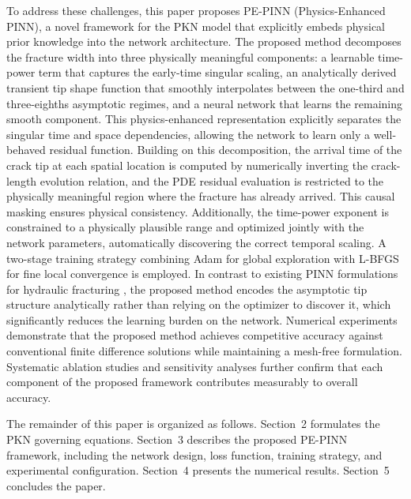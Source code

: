 \documentclass[a4paper,fleqn]{cas-sc}
\begin{document}
To address these challenges, this paper proposes PE-PINN
(Physics-Enhanced PINN), a novel framework for the PKN model that
explicitly embeds physical prior knowledge into the network architecture.
The proposed method decomposes the fracture width into three physically
meaningful components: a learnable time-power term that captures the
early-time singular scaling, an analytically derived transient tip shape
function that smoothly interpolates between the one-third and
three-eighths asymptotic regimes, and a neural network that learns the
remaining smooth component. This physics-enhanced representation
explicitly separates the singular time and space dependencies, allowing
the network to learn only a well-behaved residual function. Building on
this decomposition, the arrival time of the crack tip at each spatial
location is computed by numerically inverting the crack-length evolution
relation, and the PDE residual evaluation is restricted to the physically
meaningful region where the fracture has already arrived. This causal
masking ensures
physical consistency. Additionally, the time-power exponent is
constrained to a physically plausible range and optimized jointly with
the network parameters, automatically discovering the correct temporal
scaling. A two-stage training strategy combining Adam \cite{Kingma2015}
for global exploration with L-BFGS \cite{Liu1989} for fine local
convergence is employed. In contrast to existing PINN formulations for
hydraulic fracturing \cite{Yang2023,Tang2024}, the proposed method
encodes the asymptotic tip structure analytically rather than relying on
the optimizer to discover it, which significantly reduces the learning
burden on the network. Numerical experiments demonstrate that the
proposed method achieves competitive accuracy against conventional
finite difference solutions while maintaining a mesh-free formulation.
Systematic ablation studies and sensitivity analyses further confirm
that each component of the proposed framework contributes measurably to
overall accuracy.

The remainder of this paper is organized as follows. Section~2 formulates
the PKN governing equations. Section~3 describes the proposed PE-PINN
framework, including the network design, loss function, training
strategy, and experimental configuration. Section~4 presents the
numerical results. Section~5 concludes the paper.

\end{document}
